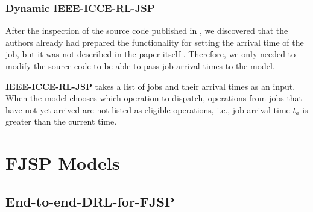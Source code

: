 \subsubsection{Dynamic IEEE-ICCE-RL-JSP}

After the inspection of the source code \cite{github_ieee_icce_rl_jsp} published in \cite{10226873}, we discovered that the authors already had prepared the functionality for setting the arrival time of the job, but it was not described in the paper itself \cite{10226873}. Therefore, we only needed to modify the source code to be able to pass job arrival times to the model. 
\par
\textbf{IEEE-ICCE-RL-JSP} takes a list of jobs and their arrival times as an input. When the model chooses which operation to dispatch, operations from jobs that have not yet arrived are not listed as eligible operations, i.e., job arrival time $t_a$ is greater than the current time.

\section{FJSP Models}

\subsection{End-to-end-DRL-for-FJSP} 

